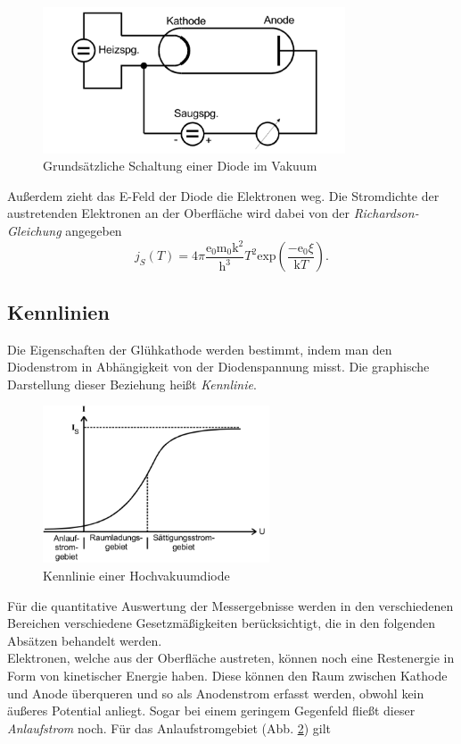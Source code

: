 \begin{figure}[H]
  \centering
  \includegraphics[width=0.8\textwidth]{content/3.png}
  \caption{Grundsätzliche Schaltung einer Diode im Vakuum \cite{sample}}
  \label{fig:3}
\end{figure}
Außerdem zieht das E-Feld der Diode die Elektronen weg.
Die Stromdichte der austretenden Elektronen an der Oberfläche wird dabei von der \textit{Richardson-Gleichung} angegeben
\begin{equation}
j_S(T) = 4 \pi \frac{\mathrm{e_0 m_0 k^2} }{\mathrm{h^3}}T^2 \mathrm{exp}(\frac{\mathrm{-e_0} \xi}{\mathrm{k}T}).
\label{eq:richardson}
\end{equation}




\subsection{Kennlinien}
\label{subsec:kennlinie}
Die Eigenschaften der Glühkathode werden bestimmt, indem man den Diodenstrom in Abhängigkeit von der Diodenspannung misst.
Die graphische Darstellung dieser Beziehung heißt \textit{Kennlinie}.
\begin{figure}[H]
  \centering
  \includegraphics[width=0.6\textwidth]{content/6.png}
  \caption{Kennlinie einer Hochvakuumdiode \cite{sample}}
  \label{fig:6}
\end{figure} 
Für die quantitative Auswertung der Messergebnisse werden in den verschiedenen Bereichen verschiedene Gesetzmäßigkeiten berücksichtigt,
die in den folgenden Absätzen behandelt werden. \\
\newline
Elektronen, welche aus der Oberfläche austreten, können noch eine Restenergie in Form von kinetischer Energie haben. Diese können den Raum zwischen Kathode und Anode überqueren und so als Anodenstrom erfasst werden,
obwohl kein äußeres Potential anliegt. Sogar bei einem geringem Gegenfeld fließt dieser \textit{Anlaufstrom} noch.
Für das Anlaufstromgebiet (Abb. \ref{fig:6}) gilt

